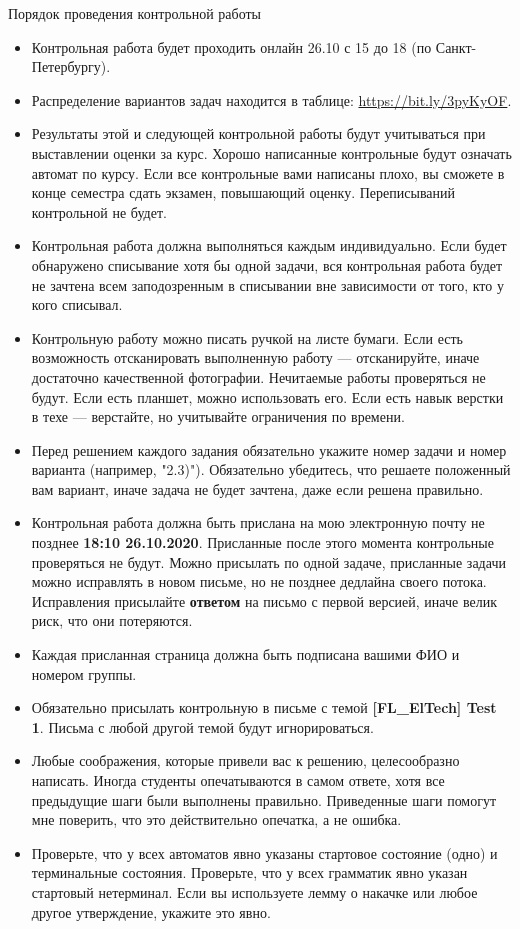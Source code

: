 \documentclass[12pt]{article}
\begin{document}
\begin{center}
  \LARGE Порядок проведения контрольной работы
\end{center}

\begin{itemize}
  \item Контрольная работа будет проходить онлайн 26.10 с 15 до 18 (по Санкт-Петербургу).
  \item Распределение вариантов задач находится в таблице: \url{https://bit.ly/3pyKyOF}.
  \item Результаты этой и следующей контрольной работы будут учитываться при выставлении оценки за курс. Хорошо написанные контрольные будут означать автомат по курсу. Если все контрольные вами написаны плохо, вы сможете в конце семестра сдать экзамен, повышающий оценку. Переписываний контрольной не будет.
  \item Контрольная работа должна выполняться каждым индивидуально. Если будет обнаружено списывание хотя бы одной задачи, вся контрольная работа будет не зачтена всем заподозренным в списывании вне зависимости от того, кто у кого списывал.
  \item Контрольную работу можно писать ручкой на листе бумаги. Если есть возможность отсканировать выполненную работу --- отсканируйте, иначе достаточно качественной фотографии. Нечитаемые работы проверяться не будут. Если есть планшет, можно использовать его. Если есть навык верстки в техе --- верстайте, но учитывайте ограничения по времени.
  \item Перед решением каждого задания обязательно укажите номер задачи и номер варианта (например, "2.3)"). Обязательно убедитесь, что решаете положенный вам вариант, иначе задача не будет зачтена, даже если решена правильно.
  \item Контрольная работа должна быть прислана на мою электронную почту не позднее \textbf{18:10 26.10.2020}. Присланные после этого момента контрольные проверяться не будут. Можно присылать по одной задаче, присланные задачи можно исправлять в новом письме, но не позднее дедлайна своего потока. Исправления присылайте \textbf{ответом} на письмо с первой версией, иначе велик риск, что они потеряются.
  \item Каждая присланная страница должна быть подписана вашими ФИО и номером группы.
  \item Обязательно присылать контрольную в письме с темой \textbf{[FL\_ElTech] Test 1}. Письма с любой другой темой будут игнорироваться.
  \item Любые соображения, которые привели вас к решению, целесообразно написать. Иногда студенты опечатываются в самом ответе, хотя все предыдущие шаги были выполнены правильно. Приведенные шаги помогут мне поверить, что это действительно опечатка, а не ошибка.
  \item Проверьте, что у всех автоматов явно указаны стартовое состояние (одно) и терминальные состояния. Проверьте, что у всех грамматик явно указан стартовый нетерминал. Если вы используете лемму о накачке или любое другое утверждение, укажите это явно.
\end{itemize}
\end{document}
